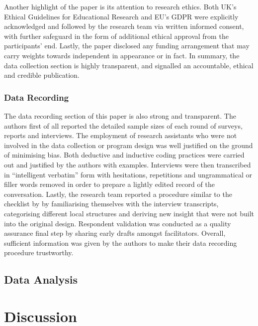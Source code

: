 \documentclass[
        a4paper, %
        12pt, %
        stu, %
        donotrepeattitle, %
        floatsintext, %
        biblatex, %
        twoside, %
        colorlinks=true,        %
        linkcolor=red,          %
        anchorcolor=red,      %
        citecolor=blue,         %
        urlcolor=blue,          %
        bookmarks=true,         %
        bookmarksopen=false,    %
        bookmarksnumbered=true,  %
        dvipsnames
]{apa7}
\begin{document}
Another highlight of the \textcite{hennessy:2021} paper is its attention to research ethics. Both UK's Ethical Guidelines for Educational Research and EU's GDPR were explicitly acknowledged and followed by the research team via written informed consent, with further safeguard in the form of additional ethical approval from the participants' end. Lastly, the paper disclosed any funding arrangement that may carry weights towards independent in appearance or in fact. In summary, the data collection section is highly transparent, and signalled an accountable, ethical and credible publication.

\subsubsection{Data Recording}

The data recording section of this paper is also strong and transparent. The authors first of all reported the detailed sample sizes of each round of surveys, reports and interviews. The employment of research assistants who were not involved in the data collection or program design was well justified on the ground of minimising bias. Both deductive and inductive coding practices were carried out and justified by the authors with examples. Interviews were then transcribed in ``intelligent verbatim'' form with hesitations, repetitions and ungrammatical or filler words removed in order to prepare a lightly edited record of the conversation. Lastly, the research team reported a procedure similar to the checklist by \textcite[][pp. 193--195]{creswell:2018} by familiarising themselves with the interview transcripts, categorising different local structures and deriving new insight that were not built into the original design. Respondent validation was conducted as a quality assurance final step by sharing early drafts amongst facilitators. Overall, sufficient information was given by the authors to make their data recording procedure trustworthy.

\subsection{Data Analysis}



\section{Discussion} %

\printbibliography
\end{document}

